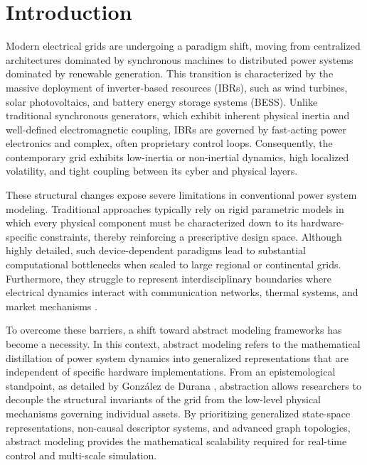 \documentclass[energies,accept,oneauthor,pdftex]{Definitions/mdpi}
\begin{document}
\maketitle



\section{Introduction}

Modern electrical grids are undergoing a paradigm shift, moving from centralized architectures dominated by synchronous machines to distributed power systems dominated by renewable generation. This transition is characterized by the massive deployment of inverter-based resources (IBRs), such as wind turbines, solar photovoltaics, and battery energy storage systems (BESS). Unlike traditional synchronous generators, which exhibit inherent physical inertia and well-defined electromagnetic coupling, IBRs are governed by fast-acting power electronics and complex, often proprietary control loops. Consequently, the contemporary grid exhibits low-inertia or non-inertial dynamics, high localized volatility, and tight coupling between its cyber and physical layers.

These structural changes expose severe limitations in conventional power system modeling. Traditional approaches typically rely on rigid parametric models in which every physical component must be characterized down to its hardware-specific constraints, thereby reinforcing a prescriptive design space. Although highly detailed, such device-dependent paradigms lead to substantial computational bottlenecks when scaled to large regional or continental grids. Furthermore, they struggle to represent interdisciplinary boundaries where electrical dynamics interact with communication networks, thermal systems, and market mechanisms \cite{Nagsarkar2007}.

To overcome these barriers, a shift toward abstract modeling frameworks has become a necessity. In this context, abstract modeling refers to the mathematical distillation of power system dynamics into generalized representations that are independent of specific hardware implementations. From an epistemological standpoint, as detailed by González de Durana \cite{AbstractModelingEpistemology2026b}, abstraction allows researchers to decouple the structural invariants of the grid from the low-level physical mechanisms governing individual assets. By prioritizing generalized state-space representations, non-causal descriptor systems, and advanced graph topologies, abstract modeling provides the mathematical scalability required for real-time control and multi-scale simulation.
\end{document}
